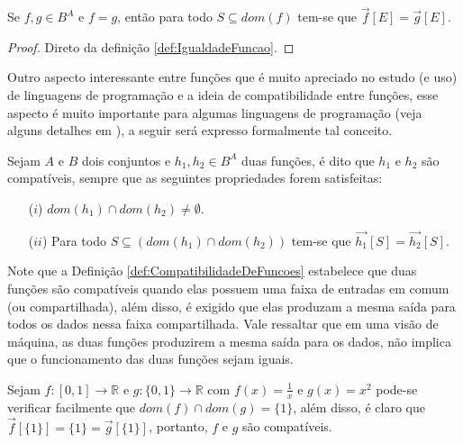 \begin{teorema}
	Se $f, g \in B^A$ e $f = g$, então para todo $S \subseteq dom(f)$ tem-se que $\overrightarrow{f}[E] = \overrightarrow{g}[E]$. 
\end{teorema}

\begin{proof}
	Direto da definição \ref{def:IgualdadeFuncao}.
\end{proof}

Outro aspecto interessante entre funções que é muito apreciado no estudo (e uso) de linguagens de programação e a ideia de compatibilidade entre funções, esse aspecto é muito importante para algumas linguagens de programação (veja alguns detalhes em \cite{ibmFC}), a seguir será expresso formalmente tal conceito.

\begin{definicao}\label{def:CompatibilidadeDeFuncoes}
	Sejam $A$ e $B$ dois conjuntos e $h_1, h_2 \in B^A$ duas funções, é dito que $h_1$ e $h_2$ são compatíveis, sempre que as seguintes propriedades forem satisfeitas:
	\begin{itemize}
		\item[($i$)] $dom(h_1) \cap dom(h_2) \neq \emptyset$.
		\item[($ii$)] Para todo $S \subseteq (dom(h_1) \cap dom(h_2))$  tem-se que $\overrightarrow{h_1}[S] = \overrightarrow{h_2}[S]$.
	\end{itemize}
\end{definicao}

Note que a Definição \ref{def:CompatibilidadeDeFuncoes} estabelece que duas funções são compatíveis quando elas possuem uma faixa de entradas em comum (ou compartilhada), além disso, é exigido que elas produzam a mesma saída para todos os dados nessa faixa compartilhada. Vale ressaltar que em uma visão de máquina, as duas funções produzirem a mesma saída para os dados, não implica que o funcionamento das duas funções sejam iguais.

\begin{exemplo}\label{exe:FuncoesCompativeis1}
	Sejam $f: [0,1] \rightarrow \mathbb{R}$ e $g: \{0,1\} \rightarrow \mathbb{R}$ com $f(x) = \displaystyle\frac{1}{x}$ e $g(x) = x^2$ pode-se verificar facilmente que $dom(f) \cap dom(g) = \{1\}$, além disso, é claro que $\overrightarrow{f}[\{1\}] = \{1\} = \overrightarrow{g}[\{1\}]$, portanto, $f$ e $g$ são compatíveis.
\end{exemplo}

